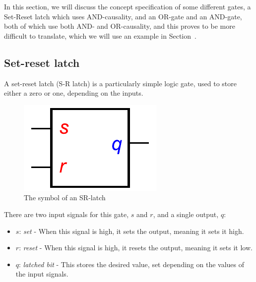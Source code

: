 \documentclass[british,conference,compsoc]{IEEEtran}
\begin{document}
In this section, we will discuss the concept specification of some different gates,
a Set-Reset latch which uses AND-causality, and an OR-gate and an AND-gate, both of 
which use both AND- and OR-causality, and this proves to be more difficult to translate,
which we will use an example in Section~\label{translation-algorithm}.


\subsection{Set-reset latch \label{sub:srlatch}}

A set-reset latch (S-R latch) is a particularly simple logic gate, used to store either a zero or one,
depending on the inputs. 


\begin{figure}[h]
\begin{centering}
\includegraphics[scale=0.51]{Images/sr-latch-circuit}
\par\end{centering}
\protect\caption{\label{fig:sr-latch-circuit} The symbol of an SR-latch}
\end{figure}

\noindent There are two input signals for this gate, $s$ and $r$, and a single output, $q$: 

\begin{itemize}
  \item $s$: \emph{set} - When this signal is high, it sets the output, meaning it sets it high.
  \item $r$: \emph{reset} - When this signal is high, it resets the output, meaning it sets it low.
  \item $q$: \emph{latched bit} - This stores the desired value, set depending on the values of the input signals.
\end{itemize}
\end{document}
